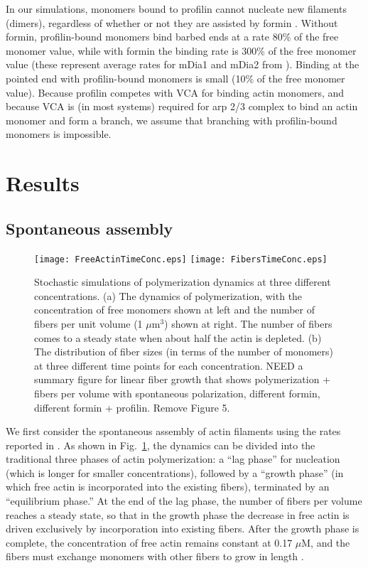 \documentclass[11pt]{article}
\newcommand{\red}[1]{\color{red}#1\normalcolor}
\begin{document}
In our simulations, monomers bound to profilin cannot nucleate new filaments (dimers), regardless of whether or not they are assisted by formin \cite{paul2009review}. Without formin, profilin-bound monomers bind barbed ends at a rate 80\% of the free monomer value, while with formin the binding rate is 300\% of the free monomer value (these represent average rates for mDia1 and mDia2 from \cite{kovar2006control}). Binding at the pointed end with profilin-bound monomers is small (10\% of the free monomer value). Because profilin competes with VCA for binding actin monomers, and because VCA is (in most systems) required for arp 2/3 complex to bind an actin monomer and form a branch, we assume that branching with profilin-bound monomers is impossible. 

\section{Results \label{sec:FilAct}}
\subsection{Spontaneous assembly}

\begin{figure}
\centering
\texttt{[image: FreeActinTimeConc.eps]}
\texttt{[image: FibersTimeConc.eps]}
\caption{\label{fig:ActinPolyMix}Stochastic simulations of polymerization dynamics at three different concentrations. (a) The dynamics of polymerization, with the concentration of free monomers shown at left and the number of fibers per unit volume (1 $\mu$m$^3$) shown at right. The number of fibers comes to a steady state when about half the actin is depleted. (b) The distribution of fiber sizes (in terms of the number of monomers) at three different time points for each concentration. \red{NEED a summary figure for linear fiber growth that shows polymerization + fibers per volume with spontaneous polarization, different formin, different formin + profilin. Remove Figure 5.} }
\end{figure}

We first consider the spontaneous assembly of actin filaments using the rates reported in \cite{rosenbloom2021mechanism}. As shown in Fig.\ \ref{fig:ActinPolyMix}, the dynamics can be divided into the traditional three phases of actin polymerization: a ``lag phase'' for nucleation (which is longer for smaller concentrations), followed by a ``growth phase'' (in which free actin is incorporated into the existing fibers), terminated by an ``equilibrium phase.'' At the end of the lag phase, the number of fibers per volume reaches a steady state, so that in the growth phase the decrease in free actin is driven exclusively by incorporation into existing fibers. After the growth phase is complete, the concentration of free actin remains constant at 0.17 $\mu$M, and the fibers must exchange monomers with other fibers to grow in length \cite{hu2007theoretical}.
\end{document}

